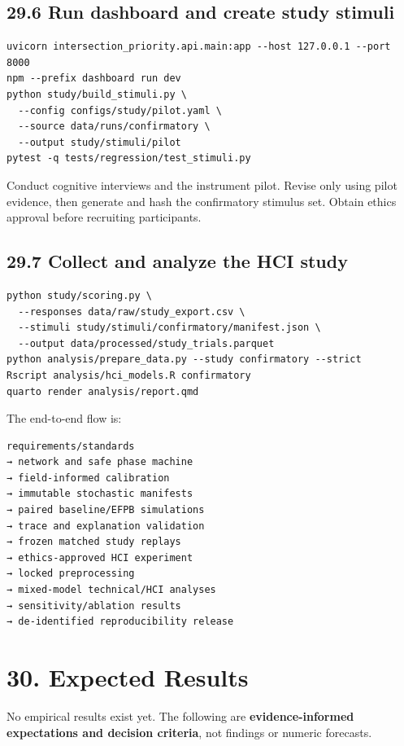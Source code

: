\documentclass[
  english,
  11pt,
  a4paper,
]{article}
\begin{document}
\subsection{29.6 Run dashboard and create study
stimuli}\label{run-dashboard-and-create-study-stimuli}

\begin{verbatim}
uvicorn intersection_priority.api.main:app --host 127.0.0.1 --port 8000
npm --prefix dashboard run dev
python study/build_stimuli.py \
  --config configs/study/pilot.yaml \
  --source data/runs/confirmatory \
  --output study/stimuli/pilot
pytest -q tests/regression/test_stimuli.py
\end{verbatim}

Conduct cognitive interviews and the instrument pilot. Revise only using
pilot evidence, then generate and hash the confirmatory stimulus set.
Obtain ethics approval before recruiting participants.

\subsection{29.7 Collect and analyze the HCI
study}\label{collect-and-analyze-the-hci-study}

\begin{verbatim}
python study/scoring.py \
  --responses data/raw/study_export.csv \
  --stimuli study/stimuli/confirmatory/manifest.json \
  --output data/processed/study_trials.parquet
python analysis/prepare_data.py --study confirmatory --strict
Rscript analysis/hci_models.R confirmatory
quarto render analysis/report.qmd
\end{verbatim}

The end-to-end flow is:

\begin{verbatim}
requirements/standards
→ network and safe phase machine
→ field-informed calibration
→ immutable stochastic manifests
→ paired baseline/EFPB simulations
→ trace and explanation validation
→ frozen matched study replays
→ ethics-approved HCI experiment
→ locked preprocessing
→ mixed-model technical/HCI analyses
→ sensitivity/ablation results
→ de-identified reproducibility release
\end{verbatim}

\section{30. Expected Results}\label{expected-results}

No empirical results exist yet. The following are
\textbf{evidence-informed expectations and decision criteria}, not
findings or numeric forecasts.
\end{document}
